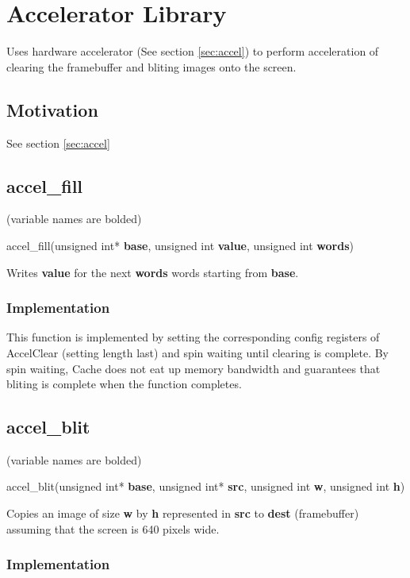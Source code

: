 \documentclass[10pt]{article}
\begin{document}
\section{Accelerator Library}

\label{sec:accel_lib}

Uses hardware accelerator (See section \ref{sec:accel}) to perform acceleration of clearing the framebuffer and bliting images onto the screen.

\subsection{Motivation}

See section \ref{sec:accel}

\subsection{accel\_fill}

(variable names are bolded)

accel\_fill(unsigned int* \textbf{base}, unsigned int \textbf{value}, unsigned int \textbf{words})

Writes \textbf{value} for the next \textbf{words} words starting from \textbf{base}.

\subsubsection{Implementation}

This function is implemented by setting the corresponding config registers of AccelClear (setting length last) and spin waiting until clearing is complete. By spin waiting, Cache does not eat up memory bandwidth and guarantees that bliting is complete when the function completes.

\subsection{accel\_blit}

(variable names are bolded)

accel\_blit(unsigned int* \textbf{base}, unsigned int* \textbf{src}, unsigned int \textbf{w},
            unsigned int \textbf{h})

Copies an image of size \textbf{w} by \textbf{h} represented in \textbf{src} to \textbf{dest} 
(framebuffer) assuming that the screen is 640 pixels wide.

\subsubsection{Implementation}
\end{document}

